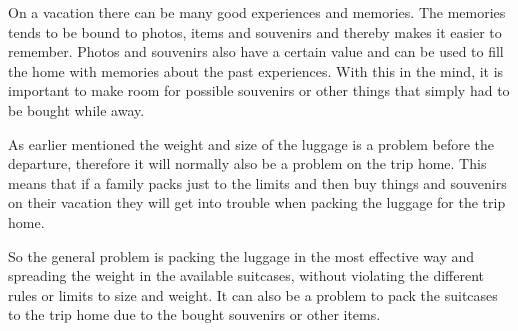 On a vacation there can be many good experiences and memories. The memories tends to be bound to photos, items and souvenirs and thereby makes it easier to remember. Photos and souvenirs also have a certain value and can be used to fill the home with memories about the past experiences.
With this in the mind, it is important to make room for possible souvenirs or other things that simply had to be bought while away.

As earlier mentioned the weight and size of the luggage is a problem before the departure, therefore it will normally also be a problem on the trip home.
This means that if a family packs just to the limits and then buy things and souvenirs on their vacation they will get into trouble when packing the luggage for the trip home.

So the general problem is packing the luggage in the most effective way and spreading the weight in the available suitcases, without violating the different rules or limits to size and weight. It can also be a problem to pack the suitcases to the trip home due to the bought souvenirs or other items.